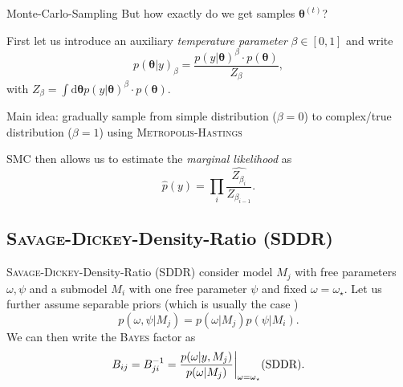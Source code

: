 \documentclass[11pt,aspectratio=1610,dvipsnames]{beamer}
\newcommand{\btheta}{\boldsymbol{\theta}}
\begin{document}
\begin{frame}{Monte-Carlo-Sampling}
	But how exactly do we get samples $\btheta^{(t)}$?
			\begin{tcolorbox}[colback=black!5,colframe=gray!15!black,title={Sequential Monte Carlo (SMC)}]
				First let us introduce an auxiliary \emph{temperature parameter} $\beta\in [0,1]$ and write
				$$p(\btheta|y)_\beta=\frac{p(y|\btheta)^\beta\cdot p(\btheta)}{Z_\beta},$$
				with $Z_\beta=\int\text{d}\btheta p(y|\btheta)^\beta\cdot p(\btheta)$.
				
				Main idea: gradually sample from simple distribution ($\beta=0$) to complex/true distribution ($\beta=1$) using \textsc{Metropolis-Hastings}
				
				SMC then allows us to estimate the \emph{marginal likelihood} as 
				\begin{equation}\label{eq:with_the_hat}
				\hat{p}(y)=\prod_{i}\widehat{\frac{Z_{\beta_i}}{Z_{\beta_{i-1}}}}.
				\end{equation}
		\end{tcolorbox}
\end{frame}


\subsection{\textsc{Savage-Dickey}-Density-Ratio (SDDR)}
\begin{frame}{\textsc{Savage-Dickey}-Density-Ratio (SDDR)}
	consider model $M_j$ with free parameters $\omega,\psi$ and a submodel $M_i$ with one free parameter $\psi$ and fixed $\omega=\omega_\star$. Let us further assume separable priors (which is usually the case \citet{trotta}) $$p(\omega,\psi|M_j)=p(\omega|M_j)p(\psi|M_i).$$
	We can then write the \textsc{Bayes} factor as \citet{trotta} \begin{equation}
	\label{eq:sddr}
	B_{ij}=B_{ji}^{-1}=\frac{p(\omega|y,M_j)}{p(\omega|M_j)}\bigg|_{\omega=\omega_\star}  \text{\hfill (SDDR)}.
	\end{equation}
\end{frame}
%
\end{document}
